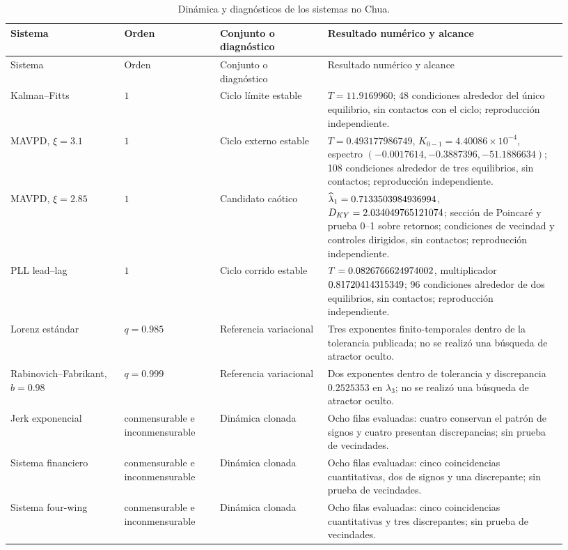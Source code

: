 \begingroup
\small
\setlength{\tabcolsep}{3pt}
\begin{longtable}{@{}L{0.19\linewidth}L{0.16\linewidth}L{0.18\linewidth}L{0.40\linewidth}@{}}
\caption{Dinámica y diagnósticos de los sistemas no Chua.}
\label{tab:nonchua-unified-evidence}\\
\toprule
Sistema & Orden & Conjunto o diagnóstico & Resultado numérico y alcance\\
\midrule
\endfirsthead
\toprule
Sistema & Orden & Conjunto o diagnóstico & Resultado numérico y alcance\\
\midrule
\endhead
Kalman--Fitts & \(1\) & Ciclo límite estable &
\(T=11.9169960\); 48 condiciones alrededor del único equilibrio, sin contactos
con el ciclo; reproducción independiente.\\
MAVPD, \(\xi=3.1\) & \(1\) & Ciclo externo estable &
\(T=0.493177986749\), \(K_{0-1}=4.40086\times10^{-4}\), espectro
\((-0.0017614,-0.3887396,-51.1886634)\); 108 condiciones alrededor de tres
equilibrios, sin contactos; reproducción independiente.\\
MAVPD, \(\xi=2.85\) & \(1\) & Candidato caótico &
\(\widehat\lambda_1=0.7133503984936994\), \(D_{KY}=2.034049765121074\); sección de
Poincaré y prueba 0--1 sobre retornos; \MAVPDChaosTotalProbes{} condiciones de
vecindad y controles dirigidos, sin contactos; reproducción independiente.\\
PLL lead--lag & \(1\) & Ciclo corrido estable &
\(T=0.0826766624974002\), multiplicador
\(0.81720414315349\); 96 condiciones alrededor de dos equilibrios,
sin contactos; reproducción independiente.\\
Lorenz estándar & \(q=0.985\) & Referencia variacional &
Tres exponentes finito-temporales dentro de la tolerancia publicada; no se
realizó una búsqueda de atractor oculto.\\
Rabinovich--Fabrikant, \(b=0.98\) & \(q=0.999\) & Referencia variacional &
Dos exponentes dentro de tolerancia y discrepancia \(0.2525353\) en
\(\lambda_3\); no se realizó una búsqueda de atractor oculto.\\
Jerk exponencial & conmensurable e inconmensurable & Dinámica clonada &
Ocho filas evaluadas: cuatro conservan el patrón de signos y cuatro presentan
discrepancias; sin prueba de vecindades.\\
Sistema financiero & conmensurable e inconmensurable & Dinámica clonada &
Ocho filas evaluadas: cinco coincidencias cuantitativas, dos de signos y una
discrepante; sin prueba de vecindades.\\
Sistema four-wing & conmensurable e inconmensurable & Dinámica clonada &
Ocho filas evaluadas: cinco coincidencias cuantitativas y tres discrepantes;
sin prueba de vecindades.\\
\bottomrule
\end{longtable}
\endgroup

